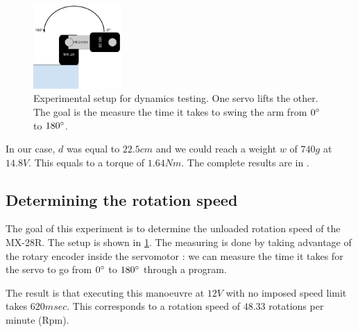 \begin{figure}[htp]
\center
    \includegraphics[width = 0.3\textwidth]{figures/exp2}
    \caption[Experimental setup dynamics testing]{Experimental setup for dynamics testing. One servo lifts the other. The goal is the measure the time it takes to swing the arm from $0\degree$ to $180\degree$.}
    \label{fig:exp2}
\end{figure}

In our case, $d$ was equal to $22.5cm$ and we could reach a weight $w$ of $740g$ at $14.8V$. This equals to a torque of $1.64Nm$. The complete results are in .

\subsection{Determining the rotation speed}
The goal of this experiment is to determine the unloaded rotation speed of the MX-28R. The setup is shown in \cref{fig:exp2}. The measuring is done by taking advantage of the rotary encoder inside the servomotor : we can measure the time it takes for the servo to go from $0\degree$ to $180\degree$ through a program.

The result is that executing this manoeuvre at $12V$ with no imposed speed limit takes $620msec$. This corresponds to a rotation speed of $48.33$ rotations per minute (Rpm).

